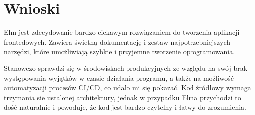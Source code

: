 \documentclass[twoside,a4paper]{report}
\begin{document}
\section{Wnioski}
Elm jest zdecydowanie bardzo ciekawym rozwiązaniem do tworzenia aplikacji frontedowych.
Zawiera świetną dokumentację i zestaw najpotrzebniejszych narzędzi, które umożliwiają szybkie i przyjemne tworzenie oprogramowania.

Stanowczo sprawdzi się w środowiskach produkcyjnych ze względu na swój brak występowania wyjątków w czasie działania programu, a także na możliwość automatyzacji procesów CI/CD, co udało mi się pokazać.
Kod źródłowy wymaga trzymania sie ustalonej architektury, jednak w przypadku Elma przychodzi to dość naturalnie i powoduje, że kod jest bardzo czytelny i łatwy do zrozumienia.


\listoffigures
\lstlistoflistings{}

\printbibliography{}

\end{document}
